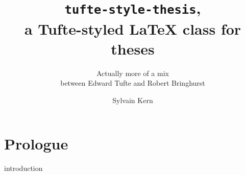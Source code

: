 \documentclass[
    10pt,
	colorful,
	boxey,
 a4paper,
]{tufte-style-thesis}
\author{Sylvain Kern}
\title{\texttt{tufte-style-thesis},\\a Tufte-styled \LaTeX{} class for theses}
\subtitle{Actually more of a mix\\between Edward Tufte and Robert Bringhurst}
\begin{document}
\ifdebug
    \layout
\fi


\frontmatter

%
%
\tableofcontents
\listoffigures
\listoftables
\listoflistings


\mainmatter

\part{Prologue}
{introduction}


\backmatter

\thispagestyle{empty}
\printbibliography
\cleardoublepage

\end{document}
